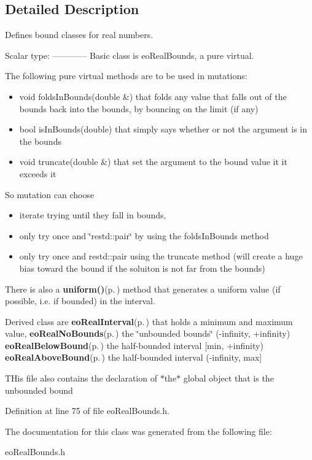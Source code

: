 \subsection{Detailed Description}
Defines bound classes for real numbers. 

Scalar type: ------------ Basic class is eo\-Real\-Bounds, a pure virtual.

The following pure virtual methods are to be used in mutations:\begin{itemize}
\item void folds\-In\-Bounds(double \&) that folds any value that falls out of the bounds back into the bounds, by bouncing on the limit (if any)\item bool is\-In\-Bounds(double) that simply says whether or not the argument is in the bounds\item void truncate(double \&) that set the argument to the bound value it it exceeds it\end{itemize}


So mutation can choose\begin{itemize}
\item iterate trying until they fall in bounds,\item only try once and \char`\"{}restd::pair\char`\"{} by using the folds\-In\-Bounds method\item only try once and restd::pair using the truncate method (will create a huge bias toward the bound if the soluiton is not far from the bounds)\end{itemize}


There is also a {\bf uniform()}{\rm (p.\,\pageref{classeo_real_bounds_a11})} method that generates a uniform value (if possible, i.e. if bounded) in the interval.

Derived class are {\bf eo\-Real\-Interval}{\rm (p.\,\pageref{classeo_real_interval})} that holds a minimum and maximum value, {\bf eo\-Real\-No\-Bounds}{\rm (p.\,\pageref{classeo_real_no_bounds})} the \char`\"{}unbounded bounds\char`\"{} (-infinity, +infinity) {\bf eo\-Real\-Below\-Bound}{\rm (p.\,\pageref{classeo_real_below_bound})} the half-bounded interval [min, +infinity) {\bf eo\-Real\-Above\-Bound}{\rm (p.\,\pageref{classeo_real_above_bound})} the half-bounded interval (-infinity, max]

THis file also contains the declaration of $\ast$the$\ast$ global object that is the unbounded bound 



Definition at line 75 of file eo\-Real\-Bounds.h.

The documentation for this class was generated from the following file:\begin{CompactItemize}
\item 
eo\-Real\-Bounds.h\end{CompactItemize}
